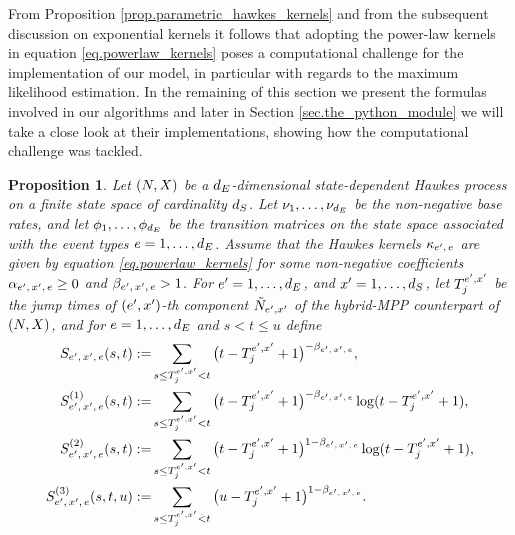\documentclass[10pt]{article}
\newtheorem{prop}[thm]{Proposition}
\begin{document}
From Proposition \ref{prop.parametric_hawkes_kernels} and from the subsequent discussion on exponential kernels it follows that adopting the power-law kernels in equation \eqref{eq.powerlaw_kernels} poses a computational challenge for the implementation of our model, in particular with regards to the maximum likelihood estimation. In the remaining of this section we present the formulas involved in our algorithms and later in Section \ref{sec.the_python_module} we will take a close look at their implementations, showing how the computational challenge was tackled. 

\begin{prop}\label{prop.intensity_and_compensator_powerlaw}
 Let $(\multiCountingProc,\stateVariable)$ be a $\numEventTypes$-dimensional state-dependent Hawkes process on a finite state space of cardinality $\numStates$. Let $\baseRate_1, \dots, \baseRate_{\numEventTypes}$ be the non-negative base rates, and let $\transProb_1, \dots,\transProb_{\numEventTypes}$ be the transition matrices on the state space associated with the event types $e=1, \dots, \numEventTypes$. Assume that the Hawkes kernels $\hawkesKernel\subscriptee$ are given by equation \eqref{eq.powerlaw_kernels} for some non-negative coefficients $\impCoef\subscriptexe \geq 0$ and $\decCoef\subscriptexe > 1$.  For $\eone = 1,\dots,\numEventTypes$, and $\xone=1,\dots,\numStates$, let $\arrivalTimes[\eone,\xone]_j$ be the jump times of $(\eone,\xone)$-th component $\hybridHawkes_{\eone,\xone}$ of the hybrid-MPP counterpart of $(\multiCountingProc,\stateVariable)$, and for $e = 1,\dots,\numEventTypes$ and $s<t\leq u$ define
 \begin{equation}\label{eq.definitions_of_ESSE}
  \begin{split}
   \ESSE\subscriptexe(s,t):=& \sum_{s\leq \arrivalTimes[\eone,\xone]_j < t}\big(t-\arrivalTimes[\eone,\xone]_j +1\big)^{-\decCoef\subscriptexe},
   \\
   \ESSEone\subscriptexe(s,t):=& \sum_{s\leq \arrivalTimes[\eone,\xone]_j < t}\big(t-\arrivalTimes[\eone,\xone]_j +1\big)^{-\decCoef\subscriptexe}\log(t-\arrivalTimes[\eone,\xone]_j +1),
   \\
   \ESSEtwo\subscriptexe(s,t):=& \sum_{s\leq \arrivalTimes[\eone,\xone]_j < t}\big(t-\arrivalTimes[\eone,\xone]_j +1\big)^{1-\decCoef\subscriptexe}\log(t-\arrivalTimes[\eone,\xone]_j +1),
   \\
   \ESSEthree\subscriptexe(s,t,u):=& \sum_{s\leq \arrivalTimes[\eone,\xone]_j < t}\big(u-\arrivalTimes[\eone,\xone]_j +1\big)^{1-\decCoef\subscriptexe}.

\end{split}
\end{equation}
\end{prop}
\end{document}
